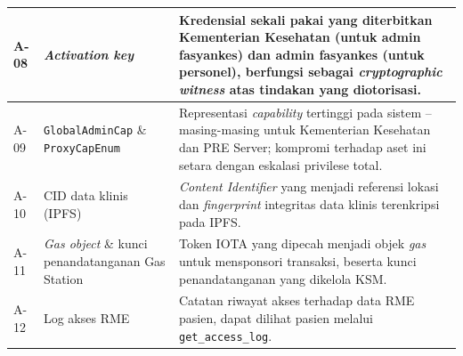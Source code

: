 \begin{xltabular}{\textwidth}{|>{\centering\arraybackslash}p{1.2cm}|>{\raggedright\arraybackslash}p{3.5cm}|X|}
    A-08 & \textit{Activation key} & Kredensial sekali pakai yang diterbitkan Kementerian Kesehatan (untuk admin fasyankes) dan admin fasyankes (untuk personel), berfungsi sebagai \textit{cryptographic witness} atas tindakan yang diotorisasi. \\
    \hline

    A-09 & \texttt{GlobalAdminCap} \& \texttt{ProxyCapEnum} & Representasi \textit{capability} tertinggi pada sistem -- masing-masing untuk Kementerian Kesehatan dan PRE Server; kompromi terhadap aset ini setara dengan eskalasi privilese total. \\
    \hline

    A-10 & CID data klinis (IPFS) & \textit{Content Identifier} yang menjadi referensi lokasi dan \textit{fingerprint} integritas data klinis terenkripsi pada IPFS. \\
    \hline

    A-11 & \textit{Gas object} \& kunci penandatanganan Gas Station & Token IOTA yang dipecah menjadi objek \textit{gas} untuk mensponsori transaksi, beserta kunci penandatanganan yang dikelola KSM. \\
    \hline

    A-12 & Log akses RME & Catatan riwayat akses terhadap data RME pasien, dapat dilihat pasien melalui \texttt{get\_access\_log}. \\
    \hline

\end{xltabular}

